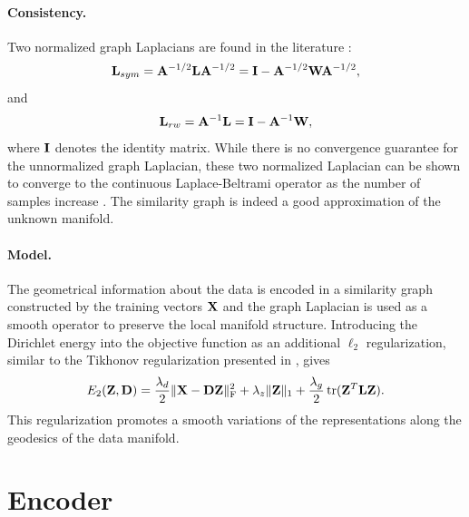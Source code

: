 \paragraph{Consistency.}
Two normalized graph Laplacians are found in the literature \cite{chung1997spectralGraphTheory}:
\begin{equation}
	\mathbf{L}_{sym} = \mathbf{A}^{-1/2} \mathbf{L} \mathbf{A}^{-1/2} = \mathbf{I} - \mathbf{A}^{-1/2} \mathbf{W} \mathbf{A}^{-1/2},
\end{equation}
and
\begin{equation}
	\mathbf{L}_{rw} = \mathbf{A}^{-1} \mathbf{L} = \mathbf{I} - \mathbf{A}^{-1} \mathbf{W},
\end{equation}
where $\mathbf{I}$ denotes the identity matrix.
While there is no convergence guarantee for the unnormalized graph Laplacian, these two normalized Laplacian can be shown to converge to the continuous Laplace-Beltrami operator as the number of samples increase \cite{vonluxburg2008consistency}. The similarity graph is indeed a good approximation of the unknown manifold.

\paragraph{Model.}
The geometrical information about the data is encoded in a similarity graph constructed by the training vectors $\mathbf{X}$ and the graph Laplacian is used as a smooth operator to preserve the local manifold structure. Introducing the Dirichlet energy into the objective function as an additional $\ell_2$ regularization, similar to the Tikhonov regularization presented in , gives
\begin{equation}
	E_2(\mathbf{Z}, \mathbf{D}) = \frac{\lambda_d}{2} \| \mathbf{X} - \mathbf{D} \mathbf{Z} \|_\text{F}^2 + \lambda_z \| \mathbf{Z} \|_1 + \frac{\lambda_g}{2} \operatorname*{tr}(\mathbf{Z}^T \mathbf{L} \mathbf{Z}).
\end{equation}
This regularization promotes a smooth variations of the representations along the geodesics of the data manifold.

\section{Encoder} \label{sec:encoder}

